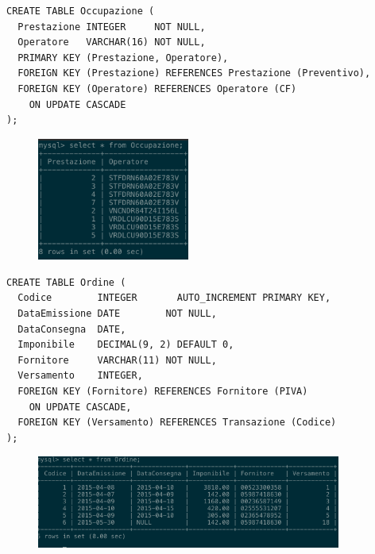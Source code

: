     \begin{lstlisting}
CREATE TABLE Occupazione (
  Prestazione INTEGER     NOT NULL,
  Operatore   VARCHAR(16) NOT NULL,
  PRIMARY KEY (Prestazione, Operatore),
  FOREIGN KEY (Prestazione) REFERENCES Prestazione (Preventivo),
  FOREIGN KEY (Operatore) REFERENCES Operatore (CF)
    ON UPDATE CASCADE
);
    \end{lstlisting}
    \begin{figure}[H]
      \centering
      \includegraphics[width=5cm]{images/screenshots/schema/occupazione.png}
    \end{figure}

    \begin{lstlisting}
CREATE TABLE Ordine (
  Codice        INTEGER       AUTO_INCREMENT PRIMARY KEY,
  DataEmissione DATE        NOT NULL,
  DataConsegna  DATE,
  Imponibile    DECIMAL(9, 2) DEFAULT 0,
  Fornitore     VARCHAR(11) NOT NULL,
  Versamento    INTEGER,
  FOREIGN KEY (Fornitore) REFERENCES Fornitore (PIVA)
    ON UPDATE CASCADE,
  FOREIGN KEY (Versamento) REFERENCES Transazione (Codice)
);
    \end{lstlisting}
    \begin{figure}[H]
      \centering
      \includegraphics[width=10cm]{images/screenshots/schema/ordine.png}
    \end{figure}

